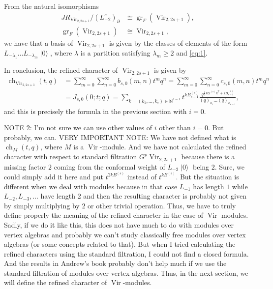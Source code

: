 \documentclass[a4paper, 12pt, reqno]{amsart}
\DeclareMathOperator{\Vir}{Vir}
\DeclareMathOperator{\ch}{ch}
\DeclareMathOperator{\vac}{|0\rangle}
\DeclareMathOperator{\gr}{gr}
\begin{document}
From the natural isomorphisms
\begin{align*}
  JR_{\Vir_{2, 2s + 1}}/(L_{-2}^s)_{\partial} &\cong \gr_F(\Vir_{2, 2s + 1}), \\
  \gr_F(\Vir_{2, 2s + 1}) &\cong \Vir_{2, 2s + 1},
\end{align*}
we have that a basis of $\Vir_{2, 2s + 1}$ is given by the classes of elements of the form $L_{-\lambda_1}\dots L_{-\lambda_m}\vac$, where $\lambda$ is a partition satisfying $\lambda_m \ge 2$ and \eqref{eq:1}.

In conclusion, the refined character of $\Vir_{2, 2s + 1}$ is given by 
\begin{align*}
  \ch_{\Vir_{2, 2s + 1}}(t, q) &= \sum_{m = 0}^{\infty}\sum_{n = 0}^{\infty}b_{s, 0}(m, n)t^mq^n = \sum_{m = 0}^{\infty}\sum_{n = 0}^{\infty}c_{s, 0}(m, n)t^mq^n \\
                               &= J_{s, 0}(0; t; q) = \sum_{k = (k_1, \dots, k_s) \in \mathbb{N}^{s - 1}}t^{kB^{(s)}_{s - 1}}\frac{q^{\frac{1}{2}kG^{(s)}k^T + kB^{(s)}_{s - 1}}}{(q)_{k_1}\dots(q)_{k_{s - 1}}},
\end{align*}
and this is precisely the formula in the previous section with $i = 0$.

NOTE 2: I'm not sure we can use other values of $i$ other than $i = 0$.
But probably, we can.
VERY IMPORTANT NOTE: We have not defined what is $\ch_M(t, q)$, where $M$ is a $\Vir$-module.
And we have not calculated the refined character with respect to standard filtration $G^p\Vir_{2, 2s + 1}$ because there is a missing factor $2$ coming from the conformal weight of $L_{-2}\vac$ being $2$.
Sure, we could simply add it here and put $t^{2kB^{(s)}}$ instead of $t^{kB^{(s)}}$.
But the situation is different when we deal with modules because in that case $L_{-1}$ has length $1$ while $L_{-2}, L_{-3}, \dots$ have length $2$ and then the resulting character is probably not given by simply multiplying by $2$ or other trivial operation.
Thus, we have to truly define properly the meaning of the refined character in the case of $\Vir$-modules.
Sadly, if we do it like this, this does not have much to do with modules over vertex algebras and probably we can't study classically free modules over vertex algebras (or some concepts related to that).
But when I tried calculating the refined characters using the standard filtration, I could not find a closed formula.
And the results in Andrew's book probably don't help much if we use the standard filtration of modules over vertex algebras.
Thus, in the next section, we will define the refined character of $\Vir$-modules.
\end{document}
